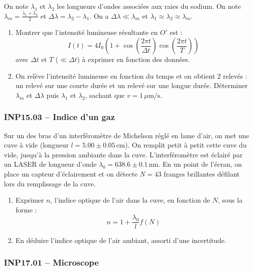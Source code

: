 On note $\lambda_1$ et $\lambda_2$ les longueurs d'ondes associées aux raies du sodium. On note $\lambda_m = \frac{\lambda_1 + \lambda_2}{2}$ et $\Delta \lambda = \lambda_2 - \lambda_1$. On a $\Delta \lambda \ll \lambda_m$ et $\lambda_1 \approx \lambda_2 \approx \lambda_m$.

\begin{enumerate}
    \item Montrer que l'intensité lumineuse résultante en $O'$ est :
    \[
    I(t) = 4 I_0 \left(1 + \cos\left(\frac{2\pi t}{\Delta t}\right) \cos\left(\frac{2\pi t}{T}\right)\right)
    \]
    avec $\Delta t$ et $T$ ($\ll \Delta t$) à exprimer en fonction des données.
    \item On relève l'intensité lumineuse en fonction du temps et on obtient 2 relevés : un relevé sur une courte durée et un relevé sur une longue durée. Déterminer $\lambda_m$ et $\Delta \lambda$ puis $\lambda_1$ et $\lambda_2$, sachant que $v = 1\, \mu \text{m/s}$.
\end{enumerate}

\begin{center}
\end{center}


\newpage
\subsubsection*{INP15.03 -- Indice d'un gaz  \corrige}

Sur un des bras d'un interféromètre de Michelson réglé en lame d'air, on met une cuve à vide (longueur $l = 5.00 \pm 0.05\, \text{cm}$). On remplit petit à petit cette cuve du vide, jusqu'à la pression ambiante dans la cuve. L'interféromètre est éclairé par un LASER de longueur d'onde $\lambda_0 = 638.6 \pm 0.1\, \text{nm}$. En un point de l'écran, on place un capteur d'éclairement et on détecte $N = 43$ franges brillantes défilant lors du remplissage de la cuve.

\begin{enumerate}
    \item Exprimer $n$, l'indice optique de l'air dans la cuve, en fonction de $N$, sous la forme :
    \[
    n = 1 + \frac{\lambda_0}{l} f(N)
    \]
    \item En déduire l'indice optique de l'air ambiant, assorti d'une incertitude.
\end{enumerate}

\newpage
\subsubsection*{INP17.01 -- Microscope  \corrige}

